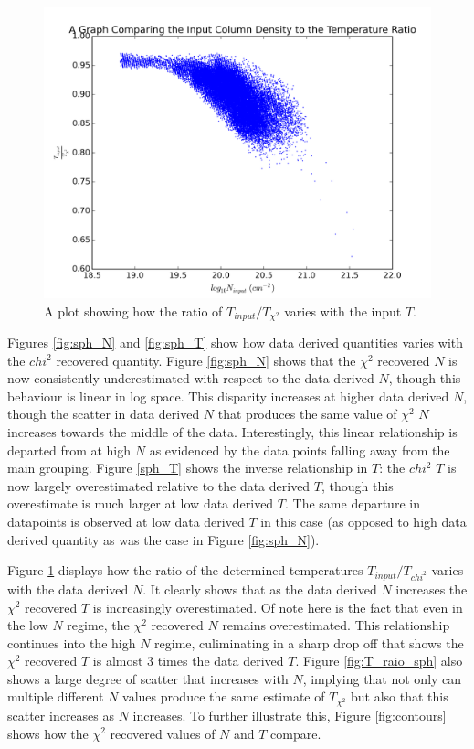 \documentclass{report}
\begin{document}
\begin{figure}[H]
  \centering
  \includegraphics[width=0.5\linewidth]{../img/sph/T_ratio_inp.png}
  \caption{A plot showing how the ratio of $T_{input}/T_{\chi^{2}}$ varies with the input $T$.}\label{fig:T_ratio_sph}
\end{figure}

Figures \ref{fig:sph_N} and \ref{fig:sph_T} show how data derived quantities varies with the $chi^{2}$ recovered quantity. Figure \ref{fig:sph_N} shows that the $\chi^{2}$ recovered $N$ is now consistently underestimated with respect to the data derived $N$, though this behaviour is linear in log space. This disparity increases at higher data derived $N$, though the scatter in data derived $N$ that produces the same value of $\chi^{2}$ $N$ increases towards the middle of the data. Interestingly, this linear relationship is departed from at high $N$ as evidenced by the data points falling away from the main grouping. Figure \ref{sph_T} shows the inverse relationship in
$T$: the $chi^{2}$ $T$ is now largely overestimated relative to the data derived $T$, though this overestimate is much larger at low data derived $T$. The same departure in datapoints is observed at low data derived $T$ in this case (as opposed to high data derived quantity as was the case in Figure \ref{fig:sph_N}).

Figure \ref{fig:T_ratio_sph} displays how the ratio of the determined temperatures $T_{input}/T_{chi^{2}}$ varies with the data derived $N$. It clearly shows that as the data derived $N$ increases the $\chi^{2}$ recovered $T$ is increasingly overestimated. Of note here is the fact that even in the low $N$ regime, the $\chi^{2}$ recovered $N$ remains overestimated. This relationship continues into the high $N$ regime, culiminating in a sharp drop off that shows the $\chi^{2}$ recovered $T$ is almost 3 times the data derived $T$.
Figure \ref{fig:T_raio_sph} also shows a large degree of scatter that increases with $N$, implying that not only can multiple different $N$ values produce the same estimate of $T_{\chi^{2}}$ but also that this scatter increases as $N$ increases. To further illustrate this, Figure \ref{fig:contours} shows how the $\chi^{2}$ recovered values of $N$ and $T$ compare.
\end{document}

